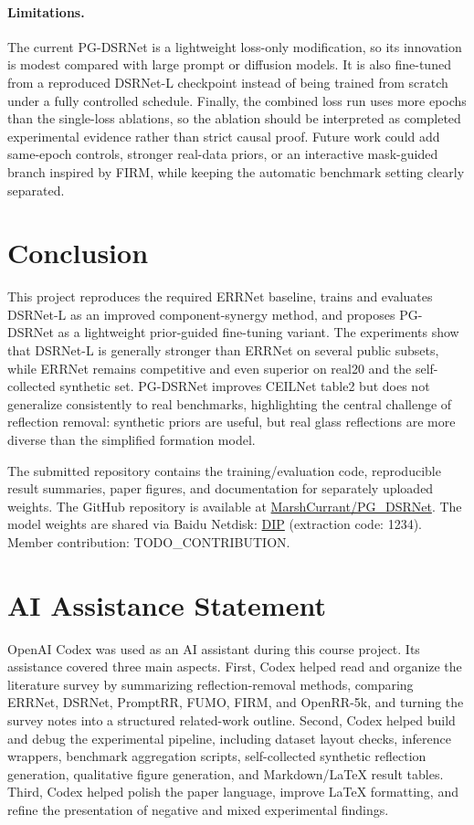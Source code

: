 \documentclass[10pt,twocolumn,letterpaper]{article}
\newcommand{\method}{PG-DSRNet\xspace}
\begin{document}
\paragraph{Limitations.}
The current \method is a lightweight loss-only modification, so its innovation is modest compared with large prompt or diffusion models.
It is also fine-tuned from a reproduced DSRNet-L checkpoint instead of being trained from scratch under a fully controlled schedule.
Finally, the combined loss run uses more epochs than the single-loss ablations, so the ablation should be interpreted as completed experimental evidence rather than strict causal proof.
Future work could add same-epoch controls, stronger real-data priors, or an interactive mask-guided branch inspired by FIRM, while keeping the automatic benchmark setting clearly separated.

\section{Conclusion}

This project reproduces the required ERRNet baseline, trains and evaluates DSRNet-L as an improved component-synergy method, and proposes \method as a lightweight prior-guided fine-tuning variant.
The experiments show that DSRNet-L is generally stronger than ERRNet on several public subsets, while ERRNet remains competitive and even superior on real20 and the self-collected synthetic set.
\method improves CEILNet table2 but does not generalize consistently to real benchmarks, highlighting the central challenge of reflection removal: synthetic priors are useful, but real glass reflections are more diverse than the simplified formation model.

The submitted repository contains the training/evaluation code, reproducible result summaries, paper figures, and documentation for separately uploaded weights.
The GitHub repository is available at \href{https://github.com/MarshCurrant/PG_DSRNet}{MarshCurrant/PG\_DSRNet}.
The model weights are shared via Baidu Netdisk: \href{https://pan.baidu.com/s/151h3CPe1i1OpOMrLGYMfKA?pwd=1234}{DIP} (extraction code: 1234).
Member contribution: TODO\_CONTRIBUTION.

\appendix
\section{AI Assistance Statement}

OpenAI Codex was used as an AI assistant during this course project.
Its assistance covered three main aspects.
First, Codex helped read and organize the literature survey by summarizing reflection-removal methods, comparing ERRNet, DSRNet, PromptRR, FUMO, FIRM, and OpenRR-5k, and turning the survey notes into a structured related-work outline.
Second, Codex helped build and debug the experimental pipeline, including dataset layout checks, inference wrappers, benchmark aggregation scripts, self-collected synthetic reflection generation, qualitative figure generation, and Markdown/LaTeX result tables.
Third, Codex helped polish the paper language, improve LaTeX formatting, and refine the presentation of negative and mixed experimental findings.
\end{document}
